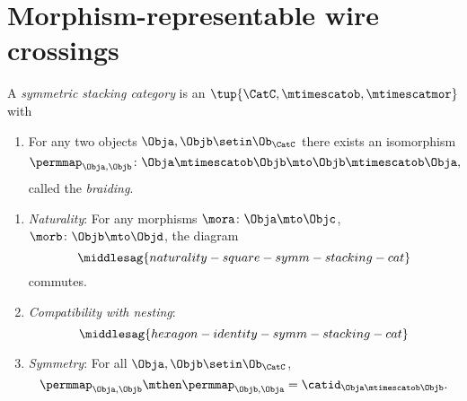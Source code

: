 
\section{Morphism-representable wire crossings}
\label{sec:symmetric-stacking-categories}



\begin{ctdefinition}
    \label{def:sym-stacking-cat}
    A \emph{symmetric stacking category} is an  $\tup{\CatC, \mtimescatob, \mtimescatmor}$ with

    \constit

    \begin{enumerate}
        \item For any two objects $\Obja, \Objb \setin \Ob_\CatC$ there exists an isomorphism
              \begin{equation}
                  \permmap_{\Obja, \Objb} \colon \Obja \mtimescatob \Objb \mto \Objb \mtimescatob \Obja,
              \end{equation}
              called the \emph{braiding}.
    \end{enumerate}

    \condit

    \begin{enumerate}
        \item \emph{Naturality}: For any morphisms $\mora \colon \Obja \mto \Objc$, $\morb \colon \Objb \mto \Objd$, the diagram
              \begin{equation}\label{eq:naturality-square-symm-stacking-cat}
                  \middlesag{naturality-square-symm-stacking-cat}
              \end{equation}
              commutes.
        \item \emph{Compatibility with nesting}:
              \begin{equation}\label{eq:hexagon-identity-symm-stacking-cat}
                  \middlesag{hexagon-identity-symm-stacking-cat}
              \end{equation}

        \item \emph{Symmetry}: For all $\Obja, \Objb \setin \Ob_\CatC$,
              \begin{equation}
                  \permmap_{\Obja, \Objb} \mthen \permmap_{\Objb, \Obja} = \catid_{\Obja \mtimescatob \Objb}.
              \end{equation}
    \end{enumerate}
\end{ctdefinition}

